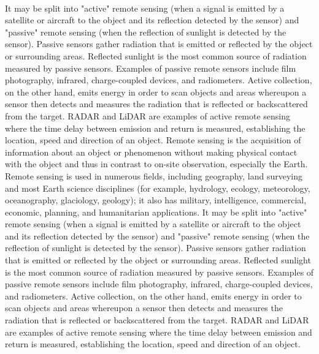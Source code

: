 \documentclass[12pt, a4paper]{report}
\begin{document}
\paragraph{}
It may be split into "active" remote sensing (when a signal is emitted by a satellite or aircraft to the object and its reflection detected by the sensor) and "passive" remote sensing (when the reflection of sunlight is detected by the sensor). Passive sensors gather radiation that is emitted or reflected by the object or surrounding areas. Reflected sunlight is the most common source of radiation measured by passive sensors. Examples of passive remote sensors include film photography, infrared, charge-coupled devices, and radiometers. Active collection, on the other hand, emits energy in order to scan objects and areas whereupon a sensor then detects and measures the radiation that is reflected or backscattered from the target. RADAR and LiDAR are examples of active remote sensing where the time delay between emission and return is measured, establishing the location, speed and direction of an object. \cite{remotesensingwiki}
Remote sensing is the acquisition of information about an object or phenomenon without making physical contact with the object and thus in contrast to on-site observation, especially the Earth. Remote sensing is used in numerous fields, including geography, land surveying and most Earth science disciplines (for example, hydrology, ecology, meteorology, oceanography, glaciology, geology); it also has military, intelligence, commercial, economic, planning, and humanitarian applications.  It may be split into "active" remote sensing (when a signal is emitted by a satellite or aircraft to the object and its reflection detected by the sensor) and "passive" remote sensing (when the reflection of sunlight is detected by the sensor). Passive sensors gather radiation that is emitted or reflected by the object or surrounding areas. Reflected sunlight is the most common source of radiation measured by passive sensors. Examples of passive remote sensors include film photography, infrared, charge-coupled devices, and radiometers. Active collection, on the other hand, emits energy in order to scan objects and areas whereupon a sensor then detects and measures the radiation that is reflected or backscattered from the target. RADAR and LiDAR are examples of active remote sensing where the time delay between emission and return is measured, establishing the location, speed and direction of an object. \cite{remotesensingwiki}
\end{document}
